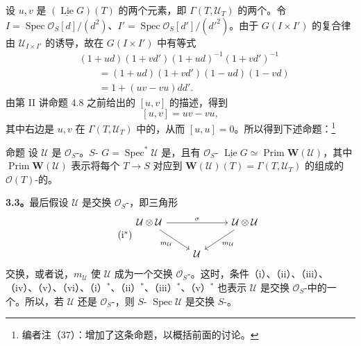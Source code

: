 设 $u,v$ 是 $(\underline{\operatorname{Lie}}G)(T)$ 的两个元素，即 $\Gamma(T,\mathcal U_T)$ 的两个。令 $I=\operatorname{Spec}\mathcal O_S[d]/(d^2)$、$I'=\operatorname{Spec}\mathcal O_S[d']/(d'^2)$。由于 $G(I\times I')$ 的复合律由 $\mathcal U_{I\times I'}$ 的诱导，故在 $G(I\times I')$ 中有等式
\[
\begin{aligned}
{}&(1+ud)(1+vd')(1+ud)^{-1}(1+vd')^{-1}\\
&\qquad=(1+ud)(1+vd')(1-ud)(1-vd)\\
&\qquad=1+(uv-vu)dd'.
\end{aligned}
\]
由第 II 讲命题 4.8 之前给出的 $[u,v]$ 的描述，得到
\[
[u,v]=uv-vu,
\]
其中右边是 $u,v$ 在 $\Gamma(T,\mathcal U_T)$ 中的，从而 $[u,u]=0$。所以得到下述命题：\footnote{编者注（37）：增加了这条命题，以概括前面的讨论。}
\begin{SGAresult}{命题}{}
设 $\mathcal U$ 是 $\mathcal O_S$-。$S$- $G=\operatorname{Spec}^*\mathcal U$ 是，且有 $\mathcal O_S$- $\underline{\operatorname{Lie}}G\simeq\operatorname{Prim}\mathbf W(\mathcal U)$，其中 $\operatorname{Prim}\mathbf W(\mathcal U)$ 表示将每个 $T\to S$ 对应到 $\mathbf W(\mathcal U)(T)=\Gamma(T,\mathcal U_T)$ 的组成的 $\mathcal O(T)$-的。
\end{SGAresult}
\textbf{3.3。}最后假设 $\mathcal U$ 是交换 $\mathcal O_S$-，即三角形
\[
\tag{$\mathrm i^*$}
\begin{tikzcd}
\mathcal U\otimes\mathcal U\arrow[rr,"\sigma"]\arrow[dr,"m_{\mathcal U}"']&&\mathcal U\otimes\mathcal U\arrow[dl,"m_{\mathcal U}"]\\
&\mathcal U&
\end{tikzcd}
\]
交换，或者说，$m_{\mathcal U}$ 使 $\mathcal U$ 成为一个交换 $\mathcal O_S$-。这时，条件（i）、（ii）、（iii）、（iv）、（v）、（vi）、（i）$^*$、（ii）$^*$、（iii）$^*$、（v）$^*$ 也表示 $\mathcal U$ 是交换 $\mathcal O_S$-中的一个。所以，若 $\mathcal U$ 还是 $\mathcal O_S$-，则 $S$- $\operatorname{Spec}\mathcal U$ 是交换 $S$-。

